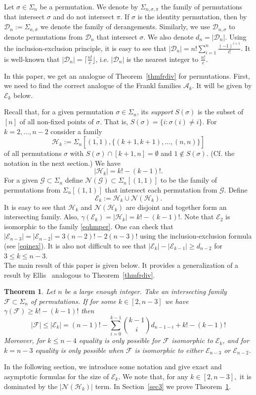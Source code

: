 \documentclass[11pt]{extarticle}
\numberwithin{equation}{section} %
\theoremstyle{plain}
\newtheorem{theorem}[thm]{Theorem}
\theoremstyle{definition}
\newcommand{\FF}{\mathcal{F}}
\newcommand{\m}{\mathcal}
\newcommand{\HH}{\mathcal{H}}
\begin{document}
 Let $\sigma \in \Sigma_n$ be a permutation. We denote by $\Sigma_{n, \sigma, \overline{\pi}}$ the family of permutations that intersect $\sigma$ and do not  intersect $\pi$.   If $\sigma$ is the identity permutation, then by $\m{D}_n := \Sigma_{n, \overline{\sigma}}$ we denote the family of derangements. Similarly, we use $\m{D}_{n, \sigma}$ to denote permutations from $\m{D}_{n}$ that intersect $\sigma$.
 We also denote $d_n = |\m{D}_n|$. 
 Using the inclusion-exclusion principle, it is easy to see that $|\m{D}_n| = n!\sum_{i=1}^n \frac{(-1)^{i+1}}{i!}$.  It is well-known  that $|\m{D}_n| = \lceil \frac{n!}{e} \rfloor$, i.e. $|\m{D}_n|$ is the nearest integer to $\frac{n!}{e}$.



In this paper, we get an analogue of Theorem~\ref{thmfrdiv} for permutations. First, we need to find the correct analogue of the Frankl families $\m A_k$. It will be given by $\m E_k$ below.

Recall that, for a given permutation $\sigma\in \Sigma_n$, its {\it support } $S(\sigma)$ is the subset of $[n]$ of all non-fixed points of $\sigma$. That is, $S(\sigma)=\{i: \sigma(i)\ne i\}.$ 
For $k=2,\ldots, n-2$ consider a family $$\HH_k := \Sigma_{n}[\overline{(1, 1)}, \{(k+1, k+1), \dots, (n, n)\}]$$ of all permutations $\sigma$ with $S(\sigma)\cap [k+1,n]=\emptyset$ and $1\notin S(\sigma)$. (Cf. the notation in the next section.) We have $$|\HH_k| = k! - (k-1)!.$$ For a given $\m{G}\subset \Sigma_n$ define $\m{N}(\m{G}) \subset \Sigma_n[(1, 1)]$ to be the family of permutations from $\Sigma_n[(1, 1)]$ that intersect each permutation from $\m{G}$. 
Define 
$$\m{E}_k := \HH_k \cup \m{N}(\HH_k).$$
It is easy to see that $\HH_k$ and $\m N(\m H_k)$ are disjoint and together form an intersecting family. Also, $\gamma(\m E_k) = |\m H_k| = k!-(k-1)!.$ Note that $\m E_2$ is isomorphic to the family \eqref{eqhmper}. One can  check that  $|\m{E}_{n-3}| = |\m{E}_{n-2}|=3(n-2)!-2(n-3)!$ using the inclusion-exclusion formula (see \eqref{eqinex}). It is also not difficult to see that $|\m{E}_k|-|\m{E}_{k-1}|\ge d_{n-2}$ for $3\le k\leq n-3$. \\

The main result of this paper is given below. It provides a generalization of a result by Ellis~\cite{Ell} analogous to Theorem~\ref{thmfrdiv}.  \begin{theorem} \label{diversity}
    Let $n$ be a large enough integer. Take an intersecting family $\FF\subset \Sigma_n$ of permutations. If for some $k\in [2,n-3]$ we have $\gamma(\FF) \ge k! - (k-1)!$ then $$|\FF| \leq |\m E_k| = (n-1)! - \sum_{i = 0}^{k-1} {k-1 \choose i} d_{n-1-i} + k! - (k-1)!$$ 
    Moreover, for $k\le n-4$ equality is only possible for $\m F$ isomorphic to $\m E_k$, and for $k=n-3$ equality is only possible when $\m F$ is isomorphic to either $\m E_{n-3}$ or $\m E_{n-2}$.
\end{theorem}
In the following section, we introduce some notation and give exact and  asymptotic formulas for the size of $\m E_k$. We note that, for any $k\in[2,n-3],$ it is dominated by the $|\m N(\m H_k)|$ term.   In Section~\ref{sec3} we prove Theorem~\ref{diversity}.
\end{document}
